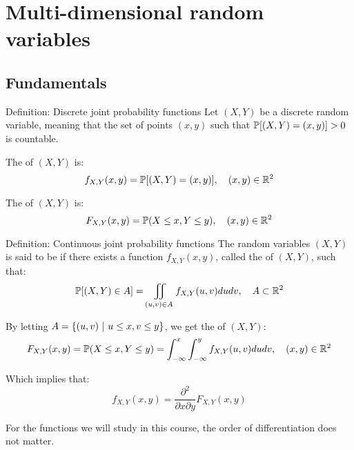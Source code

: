 \documentclass[a4paper]{article}
\begin{document}
\section{Multi-dimensional random variables}
\subsection{Fundamentals}

\begin{parag}{Definition: Discrete joint probability functions}
    Let $\left(X, Y\right)$ be a discrete random variable, meaning that the set of points $\left(x, y\right)$ such that $\prob\left[\left(X, Y\right) = \left(x, y\right)\right] > 0$ is countable.

    The  of $\left(X, Y\right)$ is: 
    \[f_{X, Y}\left(x, y\right) = \prob\left[\left(X, Y\right) = \left(x, y\right)\right], \mathspace \left(x, y\right) \in \mathbb{R}^2\]
    
    The  of $\left(X, Y\right)$ is: 
    \[F_{X, Y}\left(x, y\right) = \prob\left(X \leq x, Y \leq y\right), \mathspace \left(x, y\right) \in \mathbb{R}^2\]
\end{parag}

\begin{parag}{Definition: Continuous joint probability functions}
    The random variables $\left(X, Y\right)$ is said to be  if there exists a function $f_{X, Y}\left(x, y\right)$, called the  of $\left(X, Y\right)$, such that: 
    \[\prob\left[\left(X, Y\right) \in A\right] = \iint_{\left(u, v\right) \in A} f_{X, Y}\left(u, v\right) du dv, \mathspace A \subset \mathbb{R}^2\]
    
    By letting $A = \left\{\left(u,v\right) \suchthat u \leq x, v \leq y\right\}$, we get the  of $\left(X, Y\right)$: 
    \[F_{X, Y}\left(x, y\right) = \prob\left(X \leq x, Y \leq y\right) = \int_{-\infty}^{x} \int_{-\infty}^{y} f_{X, Y}\left(u, v\right)dudv, \mathspace \left(x, y\right) \in \mathbb{R}^2\]

    Which implies that:
    \[f_{X, Y}\left(x, y\right) = \frac{\partial^{2} }{\partial x \partial y} F_{X, Y}\left(x, y\right)\]

    For the functions we will study in this course, the order of differentiation does not matter.
\end{parag}
\end{document}
